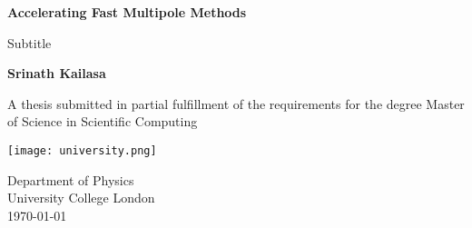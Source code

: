 \begin{titlepage}
    \begin{center}
        \vspace*{1cm}
        
        \Huge
        \textbf{Accelerating Fast Multipole Methods}
        
        \Large
        \vspace{0.5cm}
        Subtitle
             
        \vfill
 
        \textbf{Srinath Kailasa}
 
        \vspace{5cm}
             
        A thesis submitted in partial fulfillment of the requirements for the 
        degree Master of Science in Scientific Computing
             
        \vspace{0.8cm}
      
        \texttt{[image: university.png]}
        
        \large
        Department of Physics\\
        University College London\\
        \today
             
    \end{center}
 \end{titlepage}